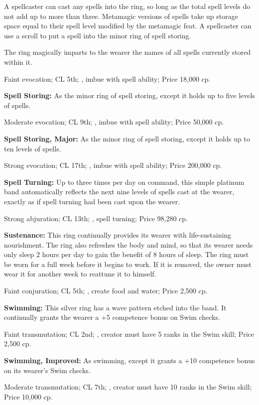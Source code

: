 A spellcaster can cast any spells into the ring, so long as the total spell levels do not add up to more than three. Metamagic versions of spells take up storage space equal to their spell level modified by the metamagic feat. A spellcaster can use a scroll to put a spell into the minor ring of spell storing.

The ring magically imparts to the wearer the names of all spells currently stored within it.

Faint evocation; CL 5th; , imbue with spell ability; Price 18,000 cp.

\textbf{Spell Storing:} As the minor ring of spell storing, except it holds up to five levels of spells.

Moderate evocation; CL 9th; , imbue with spell ability; Price 50,000 cp.

\textbf{Spell Storing, Major:} As the minor ring of spell storing, except it holds up to ten levels of spells.

Strong evocation; CL 17th; , imbue with spell ability; Price 200,000 cp.

\textbf{Spell Turning:} Up to three times per day on command, this simple platinum band automatically reflects the next nine levels of spells cast at the wearer, exactly as if spell turning had been cast upon the wearer.

Strong abjuration; CL 13th; , spell turning; Price 98,280 cp.

\textbf{Sustenance:} This ring continually provides its wearer with life-sustaining nourishment. The ring also refreshes the body and mind, so that its wearer needs only sleep 2 hours per day to gain the benefit of 8 hours of sleep. The ring must be worn for a full week before it begins to work. If it is removed, the owner must wear it for another week to reattune it to himself.

Faint conjuration; CL 5th; , create food and water; Price 2,500 cp.

\textbf{Swimming:} This silver ring has a wave pattern etched into the band. It continually grants the wearer a +5 competence bonus on Swim checks.

Faint transmutation; CL 2nd; , creator must have 5 ranks in the Swim skill; Price 2,500 cp.

\textbf{Swimming, Improved:} As swimming, except it grants a +10 competence bonus on its wearer's Swim checks.

Moderate transmutation; CL 7th; , creator must have 10 ranks in the Swim skill; Price 10,000 cp.

